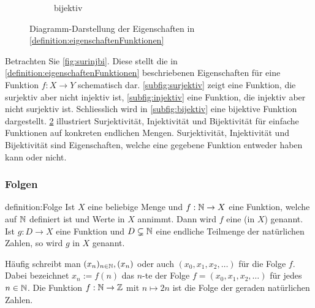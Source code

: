 \begin{figure}[H]
\begin{subfigure}[b]{0.30\textwidth}
        \caption{bijektiv}
        \label{subfig:bijektivDiagramm}
    \end{subfigure}
    \caption{Diagramm-Darstellung der Eigenschaften in \cref{definition:eigenschaftenFunktionen}}
    \label{fig:diagsurinjbi}
\end{figure} 

\noindent
Betrachten Sie \cref{fig:surinjbi}. Diese stellt die in \cref{definition:eigenschaftenFunktionen} beschriebenen Eigenschaften für eine Funktion $f:X\to Y$ schematisch dar. \cref{subfig:surjektiv} zeigt eine Funktion, die surjektiv aber nicht injektiv ist, \cref{subfig:injektiv} eine Funktion, die injektiv aber nicht surjektiv ist. Schliesslich wird in \cref{subfig:bijektiv} eine bijektive Funktion dargestellt. \cref{fig:diagsurinjbi} illustriert Surjektivität, Injektivität und Bijektivität für einfache Funktionen auf konkreten endlichen Mengen. Surjektivität, Injektivität und Bijektivität sind Eigenschaften, welche eine gegebene Funktion entweder haben kann oder nicht.

\subsubsection{Folgen}
\begin{definition}[Folge]{definition:Folge}
    Ist $X$ eine beliebige Menge und $f:\mathbb{N}\to X$ eine Funktion, welche auf $\mathbb{N}$ definiert ist und Werte in $X$ annimmt. Dann wird $f$ eine  (in $X$) genannt. Ist $g:D\to X$ eine Funktion und $D\subsetneq\mathbb{N}$ eine endliche Teilmenge der natürlichen Zahlen, so wird $g$  in $X$ genannt.
\end{definition}
Häufig schreibt man $(x_n)_{n\in\mathbb{N}}, (x_n)$ oder auch $(x_0,x_1,x_2,\dots)$ für die Folge $f$. Dabei bezeichnet $x_n := f(n)$ das $n$-te  der Folge $f = (x_0,x_1,x_2,\dots)$ für jedes $n\in\mathbb{N}$. 
\beispiel{-}
{Die Funktion $f:\mathbb{N}\to\mathbb{Z}$ mit $n\mapsto 2n$ ist die Folge der geraden natürlichen Zahlen.} 


